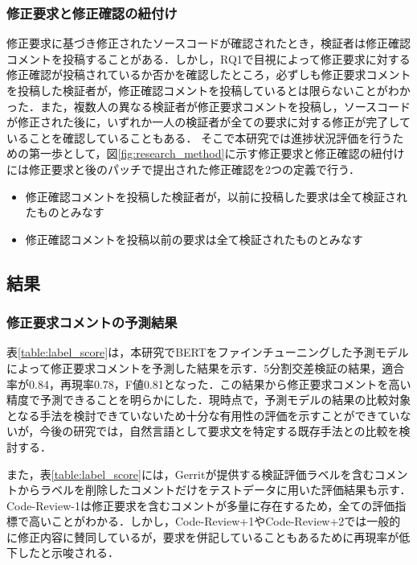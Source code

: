 \documentclass[submit,techrep,noauthor]{ipsj}
\begin{document}
\subsubsection{修正要求と修正確認の紐付け}
修正要求に基づき修正されたソースコードが確認されたとき，検証者は修正確認コメントを投稿することがある．しかし，RQ1で目視によって修正要求に対する修正確認が投稿されているか否かを確認したところ，必ずしも修正要求コメントを投稿した検証者が，修正確認コメントを投稿しているとは限らないことがわかった．また，複数人の異なる検証者が修正要求コメントを投稿し，ソースコードが修正された後に，いずれか一人の検証者が全ての要求に対する修正が完了していることを確認していることもある．
そこで本研究では進捗状況評価を行うための第一歩として，図\ref{fig:research_method}に示す修正要求と修正確認の紐付けには修正要求と後のパッチで提出された修正確認を2つの定義で行う．
\begin{itemize}
\item 修正確認コメントを投稿した検証者が，以前に投稿した要求は全て検証されたものとみなす
\item 修正確認コメントを投稿以前の要求は全て検証されたものとみなす
\end{itemize}


\subsection{結果}
\subsubsection{修正要求コメントの予測結果}
表\ref{table:label_score}は，本研究でBERTをファインチューニングした予測モデルによって修正要求コメントを予測した結果を示す．5分割交差検証の結果，適合率が0.84，再現率0.78，F値0.81となった．この結果から修正要求コメントを高い精度で予測できることを明らかにした．現時点で，予測モデルの結果の比較対象となる手法を検討できていないため十分な有用性の評価を示すことができていないが，今後の研究では，自然言語として要求文を特定する既存手法との比較を検討する．

また，表\ref{table:label_score}には，Gerritが提供する検証評価ラベルを含むコメントからラベルを削除したコメントだけをテストデータに用いた評価結果も示す．Code-Review-1は修正要求を含むコメントが多量に存在するため，全ての評価指標で高いことがわかる．しかし，Code-Review+1やCode-Review+2では一般的に修正内容に賛同しているが，要求を併記していることもあるために再現率が低下したと示唆される．
\end{document}
